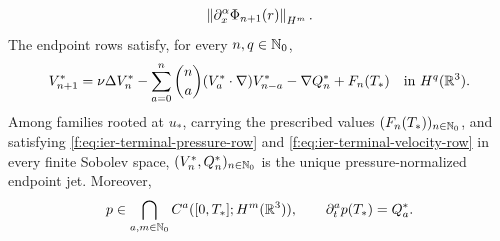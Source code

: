 \begin{theorem}
\begin{align}
 \left\lVert \partial_x^\alpha\Phi_{n+1}(r)\right\rVert_{H^m}.
 \label{f:eq:ier-terminal-mixed-pressure-modulus}
\end{align}
The endpoint rows satisfy, for every \(n,q\in\mathbb N_0\),
\begin{equation}
 V_{n+1}^*
 =\nu\Delta V_n^*
 -\sum_{a=0}^{n}\binom na(V_a^*\cdot\nabla)V_{n-a}^*
 -\nabla Q_n^*+F_n(T_*)
 \quad\text{in }H^q(\mathbb R^3).
 \label{f:eq:ier-terminal-velocity-row}
\end{equation}
Among families rooted at \(u_*\), carrying the prescribed values
\((F_n(T_*))_{n\in\mathbb N_0}\), and satisfying
\eqref{f:eq:ier-terminal-pressure-row} and
\eqref{f:eq:ier-terminal-velocity-row} in every finite Sobolev space,
\((V_n^*,Q_n^*)_{n\in\mathbb N_0}\) is the unique pressure-normalized endpoint
jet.  Moreover,
\begin{equation}
 p\in\bigcap_{a,m\in\mathbb N_0}C^a([0,T_*];H^m(\mathbb R^3)),
 \qquad
 \partial_t^ap(T_*)=Q_a^*.
 \label{f:eq:ier-complete-left-pressure-jet}
\end{equation}
\end{theorem}

